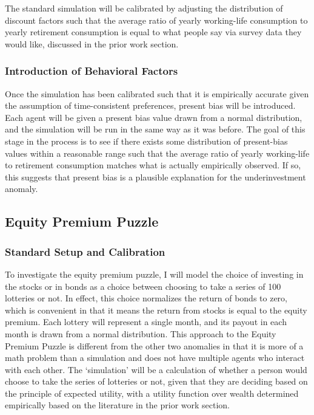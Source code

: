 \documentclass[10pt,twocolumn]{article}
\begin{document}
The standard simulation will be calibrated by adjusting the distribution of discount factors such that the average ratio of yearly working-life consumption to yearly retirement consumption is equal to what people say via survey data they would like, discussed in the prior work section. 

\subsubsection{Introduction of Behavioral Factors}
Once the simulation has been calibrated such that it is empirically accurate given the assumption of time-consistent preferences, present bias will be introduced. Each agent will be given a present bias value drawn from a normal distribution, and the simulation will be run in the same way as it was before. The goal of this stage in the process is to see if there exists some distribution of present-bias values within a reasonable range such that the average ratio of yearly working-life to retirement consumption matches what is actually empirically observed. If so, this suggests that present bias is a plausible explanation for the underinvestment anomaly. 

\subsection{Equity Premium Puzzle}
\subsubsection{Standard Setup and Calibration}
To investigate the equity premium puzzle, I will model the choice of investing in the stocks or in bonds as a choice between choosing to take a series of 100 lotteries or not. In effect, this choice normalizes the return of bonds to zero, which is convenient in that it means the return from stocks is equal to the equity premium. Each lottery will represent a single month, and its payout in each month is drawn from a normal distribution. This approach to the Equity Premium Puzzle is different from the other two anomalies in that it is more of a math problem than a simulation and does not have multiple agents who interact with each other. The ‘simulation’ will be a calculation of whether a person would choose to take the series of lotteries or not, given that they are deciding based on the principle of expected utility, with a utility function over wealth determined empirically based on the literature in the prior work section. 
\end{document}
